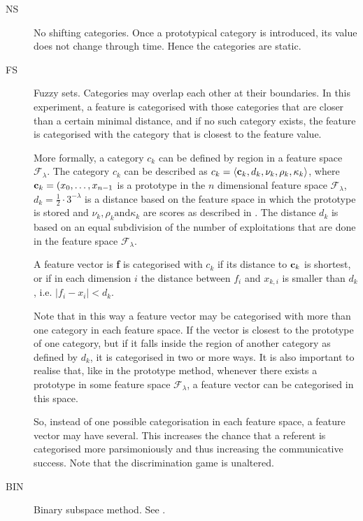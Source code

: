 \begin{description}
\item[NS] No shifting categories. Once a prototypical category is introduced, its value does not change through time. Hence the categories are static.

\item[FS] Fuzzy sets. Categories may overlap each other at their boundaries. In this experiment, a feature is categorised with those categories that are closer than a certain minimal distance, and if no such category exists, the feature is categorised with the category that is closest to the feature value. 

More formally, a category $c_k$ can be defined by region in a feature space ${\mathcal F}_\lambda$. The category $c_k$ can be described as $c_k=\langle {\bf c}_k,d_k,\nu_k,\rho_k,\kappa_k \rangle$, where ${\bf c}_k=(x_0,\ldots,x_{n-1}$ is a prototype in the $n$ dimensional feature space ${\mathcal F}_\lambda$, $d_k=\frac{1}{2} \cdot 3^{-\lambda}$ is a distance based on the feature space in which the prototype is stored and $\nu_k, \rho_k \mbox{and} \kappa_k$ are scores as described in . The distance $d_k$ is based on an equal subdivision of the number of exploitations that are done in the feature space ${\mathcal F}_\lambda$.

A feature vector is {\bf f} is categorised with $c_k$ if its distance to ${\bf c}_k$ is shortest, or if in each dimension $i$ the distance between $f_i$ and $x_{k,i}$ is smaller than $d_k$, i.e. $|f_i-x_i|<d_k$. 

Note that in this way a feature vector may be categorised with more than one category in each feature space. If the vector is closest to the prototype of one category, but if it falls inside the region of another category as defined by $d_k$, it is categorised in two or more ways. It is also important to realise that, like in the prototype method, whenever there exists a prototype in some feature space ${\mathcal F}_\lambda$, a feature vector can be categorised in this space.

So, instead of one possible categorisation in each feature space, a feature vector may have several. This increases the chance that a referent is categorised more parsimoniously and thus increasing the communicative success. Note that the discrimination game is unaltered.

\item[BIN] Binary subspace method. See .
\end{description}

